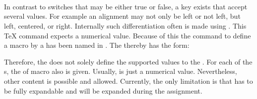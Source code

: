 \begin{Declaration}
                            \\
                            \\
  \\
\end{Declaration}
%
%
In contrast to switches that may be either true or false, a key exists
that accept several values. For example an alignment may not only be left or
not left, but left, centered, or right. Internally such
differentiation often is made using . This \TeX{} command
expects a numerical value. Because of this the command to define a macro by
a  has been named  in
. The  thereby has the form:
Therefore, the  does not solely define the supported values to the
. For each of the s, the
 of macro  also is given. Usually,
 is just a numerical value. Nevertheless, other content is
possible and allowed. Currently, the only limitation is that
 has to be fully expandable and will be expanded during the
assignment.
